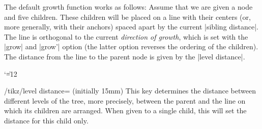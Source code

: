 The default growth function works as follows: Assume that we are given
a node and five children. These children will be placed on a line with
their centers (or, more generally, with their anchors) spaced apart by
the current |sibling distance|. The line is 
orthogonal to the current \emph{direction of growth}, which is set
with the |grow| and |grow'| option (the latter option reverses the
ordering of the children). The distance from the line to the parent node
is given by the |level distance|.

{\catcode`\|=12
\begin{codeexample}[]
\end{codeexample}
}

\begin{key}{/tikz/level distance= (initially 15mm)}
  This key determines the distance between different levels of the
  tree, more precisely, between the parent and the line 
  on which its children are arranged. When given to a single child,
  this will set the distance for this child only.
 
\begin{codeexample}[]
\end{codeexample}
 
\begin{codeexample}[]
\end{codeexample}
\end{key}

